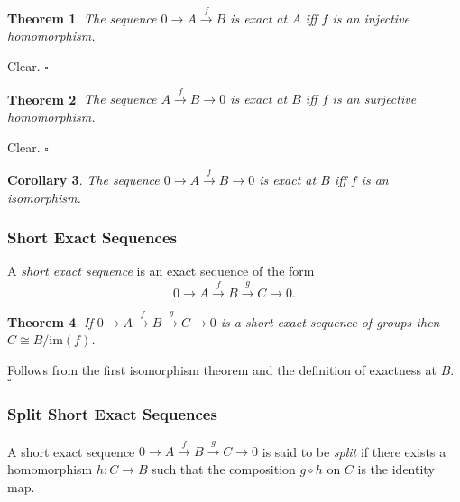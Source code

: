 \documentclass[10pt]{article}
\newtheorem{theorem}{Theorem}[section]
\newtheorem{corollary}[theorem]{Corollary}
\newenvironment{proof}[1][Proof]{\begin{trivlist}
\item[\hskip \labelsep {\itshape #1}]}{\end{trivlist}}
\newenvironment{definition}[1][Definition]{\begin{trivlist}
\item[\hskip \labelsep {\bfseries #1}]}{\end{trivlist}}
\begin{document}
\begin{theorem}
The sequence $0 \longrightarrow A \overset{f}{\longrightarrow} B$ is exact at $A$ iff $f$ is an injective homomorphism.
\end{theorem}

\begin{proof}
Clear. $\square$
\end{proof}

\begin{theorem}
The sequence $A \overset{f}{\longrightarrow} B \longrightarrow 0$ is exact at $B$ iff $f$ is an surjective homomorphism.
\end{theorem}

\begin{proof}
Clear. $\square$
\end{proof}

\begin{corollary}
The sequence $0 \longrightarrow A \overset{f}{\longrightarrow} B \longrightarrow 0$ is exact at $B$ iff $f$ is an isomorphism.
\end{corollary}

\subsubsection{Short Exact Sequences}

\begin{definition}
A \emph{short exact sequence} is an exact sequence of the form
$$0 \longrightarrow A \overset{f}{\longrightarrow} B \overset{g}{\longrightarrow} C \longrightarrow 0.$$
\end{definition}

\begin{theorem}
If $0 \longrightarrow A \overset{f}{\longrightarrow} B \overset{g}{\longrightarrow} C \longrightarrow 0$ is a short exact sequence of groups then $C \cong B/\mbox{im}(f)$.
\end{theorem}

\begin{proof}
Follows from the first isomorphism theorem and the definition of exactness at $B$. $\square$
\end{proof}

\subsubsection{Split Short Exact Sequences}

\begin{definition}
A short exact sequence $0 \longrightarrow A \overset{f}{\longrightarrow} B \overset{g}{\longrightarrow} C \longrightarrow 0$ is said to be \emph{split} if there exists a homomorphism $h : C \to B$ such that the composition $g\circ h$ on $C$ is the identity map.
\end{definition}
\end{document}
